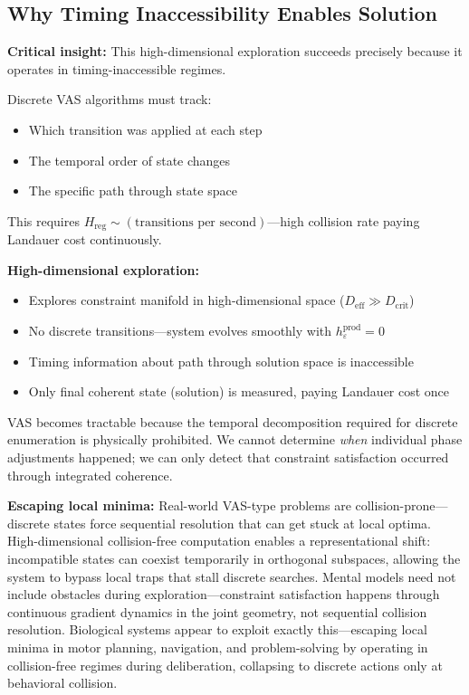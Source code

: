 \documentclass[12pt]{article}
\begin{document}
\subsection{Why Timing Inaccessibility Enables Solution}

\textbf{Critical insight:} This high-dimensional exploration succeeds precisely because it operates in timing-inaccessible regimes.

Discrete VAS algorithms must track:
\begin{itemize}
\item Which transition was applied at each step
\item The temporal order of state changes
\item The specific path through state space
\end{itemize}

This requires $H_{\text{reg}} \sim (\text{transitions per second})$---high collision rate paying Landauer cost continuously.

\textbf{High-dimensional exploration:}
\begin{itemize}
\item Explores constraint manifold in high-dimensional space ($D_{\text{eff}} \gg D_{\text{crit}}$)
\item No discrete transitions---system evolves smoothly with $h_\varepsilon^{\text{prod}} = 0$
\item Timing information about path through solution space is inaccessible
\item Only final coherent state (solution) is measured, paying Landauer cost once
\end{itemize}

VAS becomes tractable because the temporal decomposition required for discrete enumeration is physically prohibited. We cannot determine \textit{when} individual phase adjustments happened; we can only detect that constraint satisfaction occurred through integrated coherence.

\textbf{Escaping local minima:} Real-world VAS-type problems are collision-prone—discrete states force sequential resolution that can get stuck at local optima. High-dimensional collision-free computation enables a representational shift: incompatible states can coexist temporarily in orthogonal subspaces, allowing the system to bypass local traps that stall discrete searches. Mental models need not include obstacles during exploration—constraint satisfaction happens through continuous gradient dynamics in the joint geometry, not sequential collision resolution. Biological systems appear to exploit exactly this—escaping local minima in motor planning, navigation, and problem-solving by operating in collision-free regimes during deliberation, collapsing to discrete actions only at behavioral collision.
\end{document}
